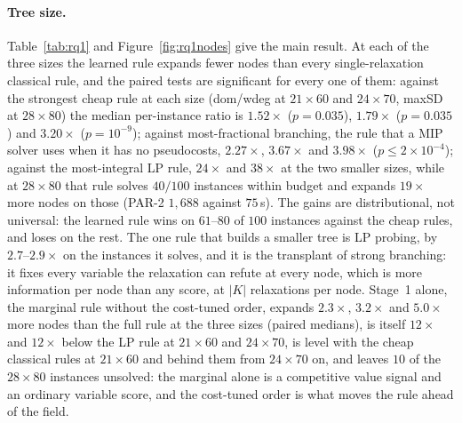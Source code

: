 \documentclass[final,5p,times,twocolumn,authoryear]{elsarticle}
\begin{document}
\paragraph{Tree size.} Table~\ref{tab:rq1} and Figure~\ref{fig:rq1nodes} give the main result. At each of the three sizes the learned rule expands fewer nodes than every single-relaxation classical rule, and the paired tests are significant for every one of them: against the strongest cheap rule at each size (dom/wdeg at $21\times60$ and $24\times70$, maxSD at $28\times80$) the median per-instance ratio is $1.52\times$ ($p=0.035$), $1.79\times$ ($p=0.035$) and $3.20\times$ ($p=10^{-9}$); against most-fractional branching, the rule that a MIP solver uses when it has no pseudocosts, $2.27\times$, $3.67\times$ and $3.98\times$ ($p\le2\times10^{-4}$); against the most-integral LP rule, $24\times$ and $38\times$ at the two smaller sizes, while at $28\times80$ that rule solves $40/100$ instances within budget and expands $19\times$ more nodes on those (PAR-2 $1{,}688$ against $75$\,s).
The gains are distributional, not universal: the learned rule wins on $61$--$80$ of $100$ instances against the cheap rules, and loses on the rest. The one rule that builds a smaller tree is LP probing, by $2.7$--$2.9\times$ on the instances it solves, and it is the transplant of strong branching: it fixes every variable the relaxation can refute at every node, which is more information per node than any score, at $|K|$ relaxations per node. Stage~1 alone, the marginal rule without the cost-tuned order, expands $2.3\times$, $3.2\times$ and $5.0\times$ more nodes than the full rule at the three sizes (paired medians), is itself $12\times$ and $12\times$ below the LP rule at $21\times60$ and $24\times70$, is level with the cheap classical rules at $21\times60$ and behind them from $24\times70$ on, and leaves $10$ of the $28\times80$ instances unsolved: the marginal alone is a competitive value signal and an ordinary variable score, and the cost-tuned order is what moves the rule ahead of the field.
\end{document}
